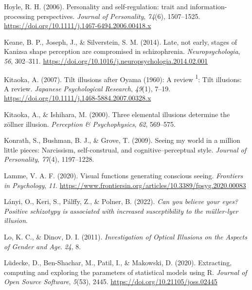\documentclass[
  man,floatsintext]{apa6}
\newlength{\cslhangindent}
\newlength{\cslentryspacingunit} %
\newenvironment{CSLReferences}[2] %
 {%
  \setlength{\parindent}{0pt}
  \ifodd #1
  \let\oldpar\par
  \def\par{\hangindent=\cslhangindent\oldpar}
  \fi
  \setlength{\parskip}{#2\cslentryspacingunit}
 }%
 {}
\begin{document}
\begin{CSLReferences}{1}{0}
\leavevmode{}%
Hoyle, R. H. (2006). Personality and self-regulation: trait and information-processing perspectives. \emph{Journal of Personality}, \emph{74}(6), 1507--1525. \url{https://doi.org/10.1111/j.1467-6494.2006.00418.x}

\leavevmode{}%
Keane, B. P., Joseph, J., \& Silverstein, S. M. (2014). Late, not early, stages of Kanizsa shape perception are compromised in schizophrenia. \emph{Neuropsychologia}, \emph{56}, 302--311. \url{https://doi.org/10.1016/j.neuropsychologia.2014.02.001}

\leavevmode{}%
Kitaoka, A. (2007). Tilt illusions after Oyama (1960): A review {\textsuperscript{1}}: Tilt illusions: A review. \emph{Japanese Psychological Research}, \emph{49}(1), 7--19. \url{https://doi.org/10.1111/j.1468-5884.2007.00328.x}

\leavevmode{}%
Kitaoka, A., \& Ishihara, M. (2000). Three elemental illusions determine the zöllner illusion. \emph{Perception \& Psychophysics}, \emph{62}, 569--575.

\leavevmode{}%
Konrath, S., Bushman, B. J., \& Grove, T. (2009). Seeing my world in a million little pieces: Narcissism, self-construal, and cognitive--perceptual style. \emph{Journal of Personality}, \emph{77}(4), 1197--1228.

\leavevmode{}%
Lamme, V. A. F. (2020). Visual functions generating conscious seeing. \emph{Frontiers in Psychology}, \emph{11}. \url{https://www.frontiersin.org/articles/10.3389/fpsyg.2020.00083}

\leavevmode{}%
Lányi, O., Keri, S., Pálffy, Z., \& Polner, B. (2022). \emph{Can you believe your eyes? Positive schizotypy is associated with increased susceptibility to the m{ü}ller-lyer illusion}.

\leavevmode{}%
Lo, K. C., \& Dinov, D. I. (2011). \emph{Investigation of Optical Illusions on the Aspects of Gender and Age}. \emph{24}, 8.

\leavevmode{}%
Lüdecke, D., Ben-Shachar, M., Patil, I., \& Makowski, D. (2020). Extracting, computing and exploring the parameters of statistical models using {R}. \emph{Journal of Open Source Software}, \emph{5}(53), 2445. \url{https://doi.org/10.21105/joss.02445}


\end{CSLReferences}
\end{document}

